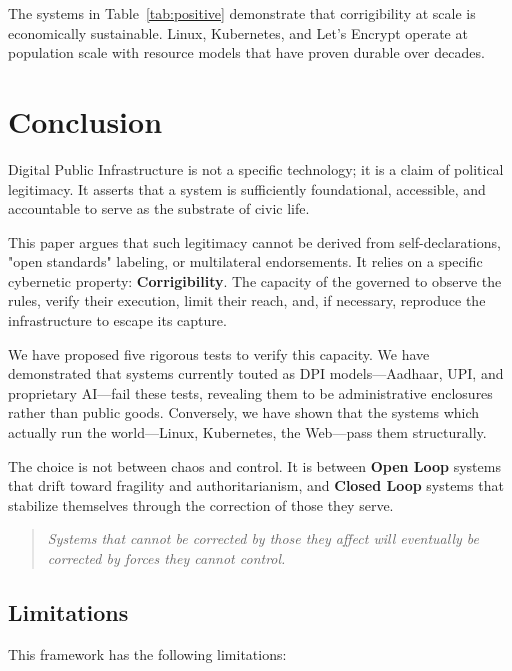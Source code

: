 \documentclass{article}
\begin{document}
The systems in Table~\ref{tab:positive} demonstrate that corrigibility at scale is economically sustainable. Linux, Kubernetes, and Let's Encrypt operate at population scale with resource models that have proven durable over decades.

\section{Conclusion}

Digital Public Infrastructure is not a specific technology; it is a claim of political legitimacy. It asserts that a system is sufficiently foundational, accessible, and accountable to serve as the substrate of civic life.

This paper argues that such legitimacy cannot be derived from self-declarations, "open standards" labeling, or multilateral endorsements. It relies on a specific cybernetic property: \textbf{Corrigibility}. The capacity of the governed to observe the rules, verify their execution, limit their reach, and, if necessary, reproduce the infrastructure to escape its capture.

We have proposed five rigorous tests to verify this capacity. We have demonstrated that systems currently touted as DPI models---Aadhaar, UPI, and proprietary AI---fail these tests, revealing them to be administrative enclosures rather than public goods. Conversely, we have shown that the systems which actually run the world---Linux, Kubernetes, the Web---pass them structurally.

The choice is not between chaos and control. It is between \textbf{Open Loop} systems that drift toward fragility and authoritarianism, and \textbf{Closed Loop} systems that stabilize themselves through the correction of those they serve.

\begin{quote}
\textit{Systems that cannot be corrected by those they affect will eventually be corrected by forces they cannot control.}
\end{quote}

\subsection{Limitations}

This framework has the following limitations:
\end{document}
